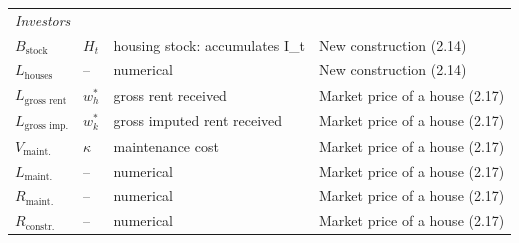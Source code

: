 \begin{tabular}{llll}
\midrule
\multicolumn{4}{l}{\textit{Investors}}\\
$B_{\text{stock}}$ & $H_t$ & housing stock: accumulates I\_t & New construction (2.14)\\
$L_{\text{houses}}$ & -- & numerical & New construction (2.14)\\
$L_{\text{gross rent}}$ & $w^{*}_h$ & gross rent received & Market price of a house (2.17)\\
$L_{\text{gross imp.}}$ & $w^{*}_k$ & gross imputed rent received & Market price of a house (2.17)\\
$V_{\text{maint.}}$ & $\kappa$ & maintenance cost & Market price of a house (2.17)\\
$L_{\text{maint.}}$ & -- & numerical & Market price of a house (2.17)\\
$R_{\text{maint.}}$ & -- & numerical & Market price of a house (2.17)\\
$R_{\text{constr.}}$ & -- & numerical & Market price of a house (2.17)\\
\bottomrule
\end{tabular}
